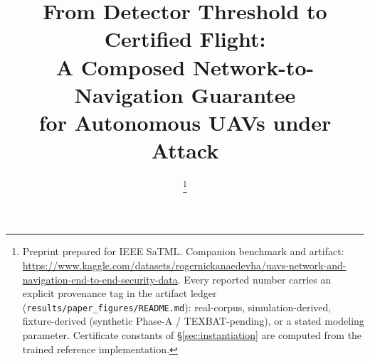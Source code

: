 \documentclass[conference]{IEEEtran}
\newcommand{\code}[1]{\texttt{#1}}
\begin{document}
\title{From Detector Threshold to Certified Flight:\\
A Composed Network-to-Navigation Guarantee\\
for Autonomous UAVs under Attack}

\author{
\thanks{Preprint prepared for IEEE SaTML. Companion benchmark and artifact:
\url{https://www.kaggle.com/datasets/rogernickanaedevha/uavs-network-and-navigation-end-to-end-security-data}.
Every reported number carries an explicit provenance tag in the artifact ledger
(\code{results/paper\_figures/README.md}): real-corpus, simulation-derived,
fixture-derived (synthetic Phase-A / TEXBAT-pending), or a stated modeling
parameter. Certificate constants of \S\ref{sec:instantiation} are computed from
the trained reference implementation.}}

\maketitle
\end{document}
